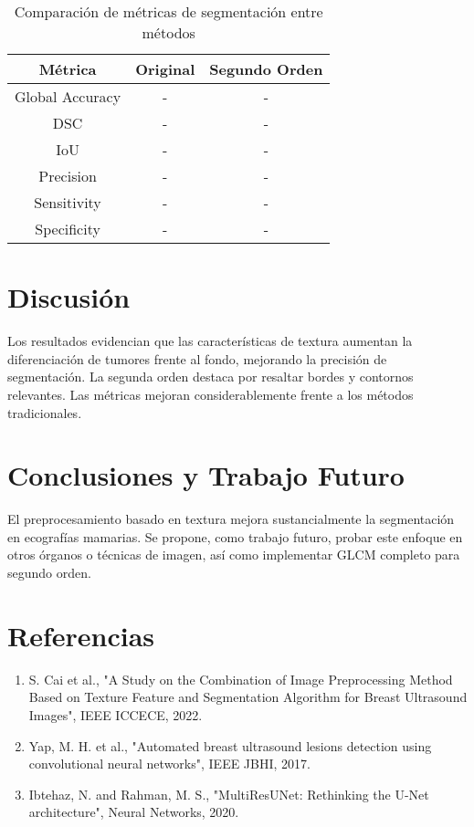 \documentclass[12pt]{article}
\begin{document}
\begin{table}[H]
\centering
\begin{tabular}{|c|c|c|}
\hline
\textbf{Métrica} & \textbf{Original} & \textbf{Segundo Orden} \\
\hline
Global Accuracy & - & - \\
DSC & - & - \\
IoU & - & - \\
Precision & - & - \\
Sensitivity & - & - \\
Specificity & - & - \\
\hline
\end{tabular}
\caption{Comparación de métricas de segmentación entre métodos}
\end{table}

\section{Discusión}
Los resultados evidencian que las características de textura aumentan la diferenciación de tumores frente al fondo, mejorando la precisión de segmentación. La segunda orden destaca por resaltar bordes y contornos relevantes. Las métricas mejoran considerablemente frente a los métodos tradicionales.

\section{Conclusiones y Trabajo Futuro}
El preprocesamiento basado en textura mejora sustancialmente la segmentación en ecografías mamarias. Se propone, como trabajo futuro, probar este enfoque en otros órganos o técnicas de imagen, así como implementar GLCM completo para segundo orden.

\section*{Referencias}
\begin{enumerate}
    \item S. Cai et al., "A Study on the Combination of Image Preprocessing Method Based on Texture Feature and Segmentation Algorithm for Breast Ultrasound Images", IEEE ICCECE, 2022.
    \item Yap, M. H. et al., "Automated breast ultrasound lesions detection using convolutional neural networks", IEEE JBHI, 2017.
    \item Ibtehaz, N. and Rahman, M. S., "MultiResUNet: Rethinking the U-Net architecture", Neural Networks, 2020.
\end{enumerate}
\end{document}
